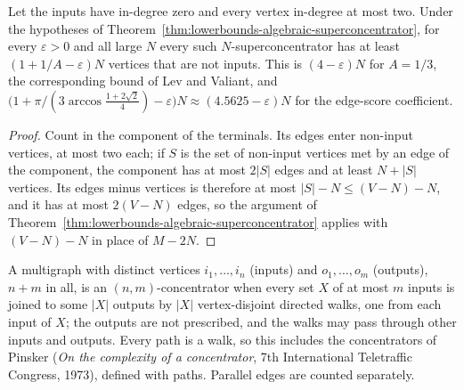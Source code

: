 \begin{corollary}
  \label{cor:lowerbounds-algebraic-superconcentrator-in-degree}
  \leanok
  Let the inputs have in-degree zero and every vertex in-degree at most two. Under the
  hypotheses of Theorem~\ref{thm:lowerbounds-algebraic-superconcentrator}, for every
  $\varepsilon>0$ and all large $N$ every such $N$-superconcentrator has at least
  $(1+1/A-\varepsilon)N$ vertices that are not inputs. This is $(4-\varepsilon)N$ for
  $A=1/3$, the corresponding bound of Lev and Valiant, and
  $\bigl(1+\pi/(3\arccos\tfrac{1+2\sqrt2}{4})-\varepsilon\bigr)N\approx(4.5625-\varepsilon)N$
  for the edge-score coefficient.
\end{corollary}
\begin{proof}
  \leanok
  Count in the component of the terminals. Its edges enter non-input vertices, at most two
  each; if $S$ is the set of non-input vertices met by an edge of the component, the
  component has at most $2|S|$ edges and at least $N+|S|$ vertices. Its edges minus vertices
  is therefore at most $|S|-N\le(V-N)-N$, and it has at most $2(V-N)$ edges, so the argument
  of Theorem~\ref{thm:lowerbounds-algebraic-superconcentrator} applies with $(V-N)-N$ in place
  of $M-2N$.
\end{proof}

\begin{definition}[Concentrator]
  \label{def:lowerbounds-algebraic-concentrator}
  \leanok
  A multigraph with distinct vertices $i_1,\dots,i_n$ (inputs) and $o_1,\dots,o_m$ (outputs),
  $n+m$ in all, is an $(n,m)$-concentrator when every set $X$ of at most $m$ inputs is joined
  to some $|X|$ outputs by $|X|$ vertex-disjoint directed walks, one from each input of $X$; the
  outputs are not prescribed, and the walks may pass through other inputs and outputs. Every
  path is a walk, so this includes the concentrators of Pinsker (\emph{On the complexity of a
  concentrator}, 7th International Teletraffic Congress, 1973), defined with paths. Parallel
  edges are counted separately.
\end{definition}

